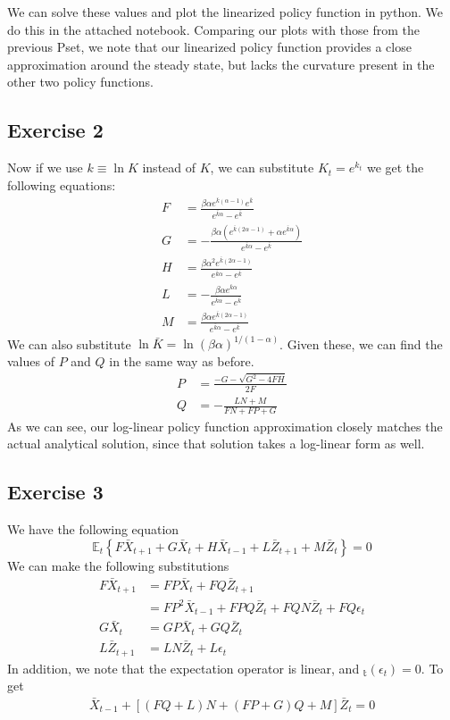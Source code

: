 \documentclass{article}
\begin{document}
	We can solve these values and plot the linearized policy function in python. We do this in the attached notebook. Comparing our plots with those from the previous Pset, we note that our linearized policy function provides a close approximation around the steady state, but lacks the curvature present in the other two policy functions.
	
	\subsection*{Exercise 2}
	Now if we use $k \equiv \ln K$ instead of $K$, we can substitute $K_t = e^{k_t}$ we get the following equations:
	\begin{align*}
	F &= \frac{\beta \alpha e^{\bar{k}(\alpha - 1)} e^{\bar{k}}}{e^{\bar{k} \alpha} - e^{\bar{k}}} \\
	G &= - \frac{\beta \alpha (e^{\bar{k}(2\alpha -1)} + \alpha e^{\bar{k} \alpha})}{e^{\bar{k} \alpha} - e^{\bar{k}}}\\
	H &= \frac{\beta \alpha^2 e^{\bar{k} (2\alpha -1)}}{e^{\bar{k} \alpha} - e^{\bar{k}}} \\
	L &= - \frac{\beta \alpha e^{\bar{k} \alpha}}{e^{\bar{k} \alpha} - e^{\bar{k}}} \\
	M &= \frac{\beta \alpha e^{\bar{k}(2\alpha -1)}}{e^{\bar{k} \alpha} - e^{\bar{k}}}		
	\end{align*}
	We can also substitute $\ln \bar{K} = \ln (\beta \alpha)^{1/(1 -\alpha)}$. Given these, we can find the values of $P$ and $Q$ in the same way as before.
	\begin{align*}
	P &= \frac{-G - \sqrt{G^2 - 4FH}}{2F}\\
	Q &= - \frac{LN+ M}{FN + FP + G}
	\end{align*}	
	As we can see, our log-linear policy function approximation closely matches the actual analytical solution, since that solution takes a log-linear form as well. 
	
	\subsection*{Exercise 3}
	We have the following equation
	\[ \mathbb{E}_t \left\{ F \bar{X}_{t+1} + G \bar{X}_t + H \bar{X}_{t-1} + L \bar{Z}_{t+1} + M \bar{Z}_t  \right\} = 0\]
	We can make the following substitutions
	\begin{align*}
	F \bar{X}_{t+1} &= FP \bar{X}_{t} + FQ \bar{Z}_{t+1} \\
	&= FP^2 \bar{X}_{t-1} +F PQ \bar{Z}_t + FQN \bar{Z}_t +F Q \epsilon_t \\
	G \bar{X}_t &= GP \bar{X}_t + GQ \bar{Z}_t \\
	L \bar{Z}_{t+1} &= LN \bar{Z}_{t} + L \epsilon_t
	\end{align*}
	In addition, we note that the expectation operator is linear, and $\mathbb{_t} (\epsilon_t) = 0$. To get
	\begin{align*}
	[(FP + G)P + H]\bar{X}_{t-1} + [(FQ + L)N + (FP + G)Q + M] \bar{Z}_t = 0
	\end{align*}
	
\end{document}
